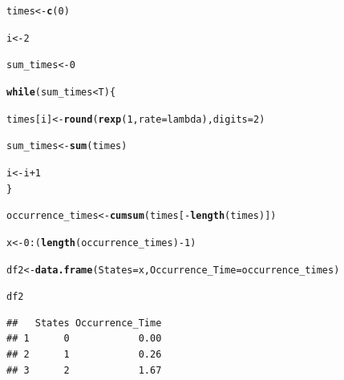 \documentclass[11pt, a4paper]{article}\usepackage[]{graphicx}\usepackage[]{xcolor}
\makeatletter
\newcommand{\hlnum}[1]{\textcolor[rgb]{0.686,0.059,0.569}{#1}}%
\newcommand{\hlopt}[1]{\textcolor[rgb]{0,0,0}{#1}}%
\newcommand{\hldef}[1]{\textcolor[rgb]{0.345,0.345,0.345}{#1}}%
\newcommand{\hlkwa}[1]{\textcolor[rgb]{0.161,0.373,0.58}{\textbf{#1}}}%
\newcommand{\hlkwb}[1]{\textcolor[rgb]{0.69,0.353,0.396}{#1}}%
\newcommand{\hlkwc}[1]{\textcolor[rgb]{0.333,0.667,0.333}{#1}}%
\newcommand{\hlkwd}[1]{\textcolor[rgb]{0.737,0.353,0.396}{\textbf{#1}}}%
\newenvironment{kframe}{%
 \def\at@end@of@kframe{}%
 \ifinner\ifhmode%
  \def\at@end@of@kframe{\end{minipage}}%
  \begin{minipage}{\columnwidth}%
 \fi\fi%
 \def\FrameCommand##1{\hskip\@totalleftmargin \hskip-\fboxsep
 \colorbox{shadecolor}{##1}\hskip-\fboxsep
     \hskip-\linewidth \hskip-\@totalleftmargin \hskip\columnwidth}%
 \MakeFramed {\advance\hsize-\width
   \@totalleftmargin\z@ \linewidth\hsize
   \@setminipage}}%
 {\par\unskip\endMakeFramed%
 \at@end@of@kframe}
\newenvironment{knitrout}{}{} %
\makeatother
\begin{document}
\begin{knitrout}
\color{fgcolor}\begin{kframe}
\begin{alltt}
\hldef{times} \hlkwb{<-} \hlkwd{c}\hldef{(}\hlnum{0}\hldef{)}

\hldef{i} \hlkwb{<-} \hlnum{2}

\hldef{sum_times} \hlkwb{<-} \hlnum{0}

\hlkwa{while}\hldef{(sum_times} \hlopt{<} \hldef{T)\{}

  \hldef{times[i]} \hlkwb{<-} \hlkwd{round}\hldef{(}\hlkwd{rexp}\hldef{(}\hlnum{1}\hldef{,} \hlkwc{rate} \hldef{= lambda),} \hlkwc{digits} \hldef{=} \hlnum{2}\hldef{)}

  \hldef{sum_times} \hlkwb{<-} \hlkwd{sum}\hldef{(times)}

  \hldef{i} \hlkwb{<-} \hldef{i} \hlopt{+} \hlnum{1}
\hldef{\}}

\hldef{occurrence_times} \hlkwb{<-} \hlkwd{cumsum}\hldef{(times[}\hlopt{-}\hlkwd{length}\hldef{(times)])}

\hldef{x} \hlkwb{<-} \hlnum{0}\hlopt{:}\hldef{(}\hlkwd{length}\hldef{(occurrence_times)}\hlopt{-}\hlnum{1}\hldef{)}
\end{alltt}
\end{kframe}
\end{knitrout}

\begin{knitrout}
\color{fgcolor}\begin{kframe}
\begin{alltt}
\hldef{df2} \hlkwb{<-} \hlkwd{data.frame}\hldef{(}\hlkwc{States} \hldef{= x,} \hlkwc{Occurrence_Time} \hldef{= occurrence_times)}
\end{alltt}
\end{kframe}
\end{knitrout}

\begin{knitrout}
\color{fgcolor}\begin{kframe}
\begin{alltt}
\hldef{df2}
\end{alltt}
\begin{verbatim}
##   States Occurrence_Time
## 1      0            0.00
## 2      1            0.26
## 3      2            1.67
\end{verbatim}
\end{kframe}
\end{knitrout}
\end{document}
